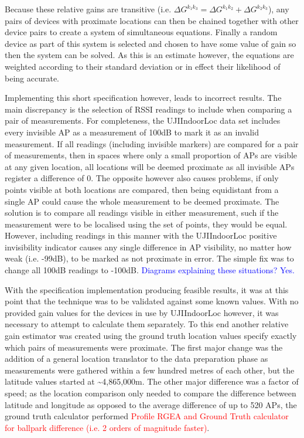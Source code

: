 \documentclass{UoYCSproject}
\begin{document}
            Because these relative gains are transitive (i.e. $\Delta G^{k_1k_3} = \Delta G^{k_1k_2} + \Delta G^{k_2k_3}$), any pairs of devices with proximate locations can then be chained together with other device pairs to create a system of simultaneous equations. Finally a random device as part of this system is selected and chosen to have some value of gain so then the system can be solved. As this is an estimate however, the equations are weighted according to their standard deviation or in effect their likelihood of being accurate.
           
            Implementing this short specification however, leads to incorrect results. The main discrepancy is the selection of RSSI readings to include when comparing a pair of measurements. For completeness, the UJIIndoorLoc data set includes every invisible AP as a measurement of 100dB to mark it as an invalid measurement. If all readings (including invisible markers) are compared for a pair of measurements, then in spaces where only a small proportion of APs are visible at any given location, all locations will be deemed proximate as all invisible APs register a difference of $0$. The opposite however also causes problems, if only points visible at both locations are compared, then being equidistant from a single AP could cause the whole measurement to be deemed proximate. The solution is to compare all readings visible in either measurement, such if the measurement were to be localised using the set of points, they would be equal. However, including readings in this manner with the UJIIndoorLoc positive invisibility indicator causes any single difference in AP visibility, no matter how weak (i.e. -99dB), to be marked as not proximate in error. The simple fix was to change all 100dB readings to -100dB. \textcolor{blue}{Diagrams explaining these situations? Yes.}
            
            With the specification implementation producing feasible results, it was at this point that the technique was to be validated against some known values. With no provided gain values for the devices in use by UJIIndoorLoc however, it was necessary to attempt to calculate them separately. To this end another relative gain estimator was created using the ground truth location values specify exactly which pairs of measurements were proximate. The first major change was the addition of a general location translator to the data preparation phase as measurements were gathered within a few hundred metres of each other, but the latitude values started at \textasciitilde4,865,000m. The other major difference was a factor of speed; as the location comparison only needed to compare the difference between latitude and longitude as opposed to the average difference of up to 520 APs, the ground truth calculator performed \textcolor{red}{Profile RGEA and Ground Truth calculator for ballpark difference (i.e. 2 orders of magnitude faster)}.
            
\end{document}
